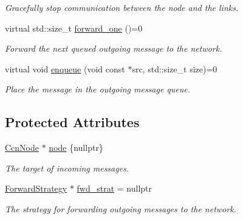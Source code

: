 \begin{DoxyCompactItemize}
\begin{DoxyCompactList}\small\item\em Gracefully stop communication between the node and the links. \end{DoxyCompactList}\item 
virtual std\-::size\-\_\-t \hyperlink{classsma_1_1LinkLayer_a5e779ec9a213244990374df07906985c}{forward\-\_\-one} ()=0
\begin{DoxyCompactList}\small\item\em Forward the next queued outgoing message to the network. \end{DoxyCompactList}\item 
\hypertarget{classsma_1_1LinkLayer_a4b183144bf01d5e4ed2f7c8f4a6f7231}{virtual void \hyperlink{classsma_1_1LinkLayer_a4b183144bf01d5e4ed2f7c8f4a6f7231}{enqueue} (void const $\ast$src, std\-::size\-\_\-t size)=0}\label{classsma_1_1LinkLayer_a4b183144bf01d5e4ed2f7c8f4a6f7231}

\begin{DoxyCompactList}\small\item\em Place the message in the outgoing message queue. \end{DoxyCompactList}\end{DoxyCompactItemize}
\subsection*{Protected Attributes}
\begin{DoxyCompactItemize}
\item 
\hypertarget{classsma_1_1LinkLayer_af1c41f5c6906c2be5757d4a615f3324a}{\hyperlink{classsma_1_1CcnNode}{Ccn\-Node} $\ast$ \hyperlink{classsma_1_1LinkLayer_af1c41f5c6906c2be5757d4a615f3324a}{node} \{nullptr\}}\label{classsma_1_1LinkLayer_af1c41f5c6906c2be5757d4a615f3324a}

\begin{DoxyCompactList}\small\item\em The target of incoming messages. \end{DoxyCompactList}\item 
\hyperlink{classsma_1_1ForwardStrategy}{Forward\-Strategy} $\ast$ \hyperlink{classsma_1_1LinkLayer_abc5610d847fa48661a6ee79d6872181b}{fwd\-\_\-strat} = nullptr
\begin{DoxyCompactList}\small\item\em The strategy for forwarding outgoing messages to the network. \end{DoxyCompactList}\end{DoxyCompactItemize}
